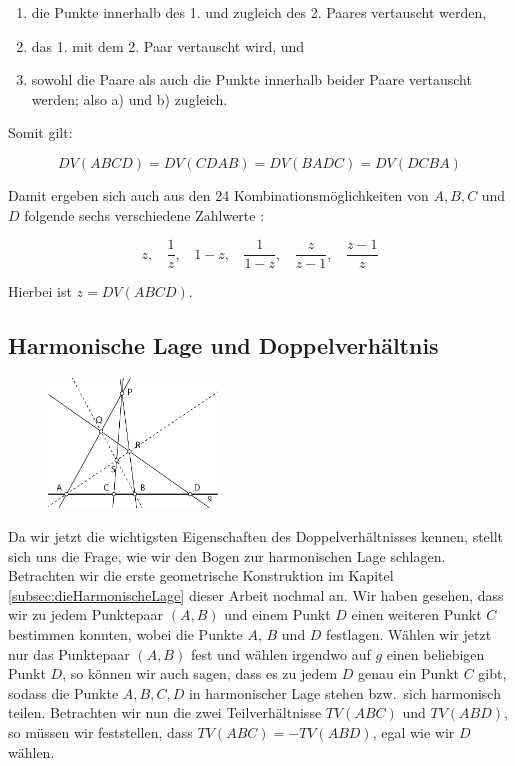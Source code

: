 \documentclass[12pt,a4paper]{article}
\begin{document}
\begin{enumerate}[label={\alph*)}] 
\item die Punkte innerhalb des 1. und zugleich des 2. Paares vertauscht werden,
\item das 1. mit dem 2. Paar vertauscht wird, und
\item sowohl die Paare als auch die Punkte innerhalb beider Paare vertauscht werden; also a) und b) zugleich.
\end{enumerate}

Somit gilt:

\[DV(A B C D) = DV(C D A B) = DV(B A D C) = DV(D C B A)\]

Damit ergeben sich auch aus den 24 Kombinationsmöglichkeiten von $A, B, C$ und $D$ folgende sechs verschiedene Zahlwerte \citep[s.][S.~77f]{projektiveGeometrie}:

\[z, ~~~~\dfrac{1}{z}, ~~~~1-z, ~~~~\dfrac{1}{1-z}, ~~~~\dfrac{z}{z-1}, ~~~~\dfrac{z-1}{z}\]

Hierbei ist $z = DV(A B C D)$.

\subsection{Harmonische Lage und Doppelverhältnis}

\begin{figure}
\includegraphics[width=0.4\textwidth]{Bilder/herleitung3.png}
\end{figure}

Da wir jetzt die wichtigsten Eigenschaften des Doppelverhältnisses kennen, stellt sich uns die Frage, wie wir den Bogen zur harmonischen Lage schlagen. Betrachten wir die erste geometrische Konstruktion im Kapitel \ref{subsec:dieHarmonischeLage} dieser Arbeit nochmal an. Wir haben gesehen, dass wir zu jedem Punktepaar $(A, B)$ und einem Punkt $D$ einen weiteren Punkt $C$ bestimmen konnten, wobei die Punkte $A$, $B$ und $D$ festlagen. Wählen wir jetzt nur das Punktepaar $(A, B)$ fest und wählen irgendwo auf $g$ einen beliebigen Punkt $D$, so können wir auch sagen, dass es zu jedem $D$ genau ein Punkt $C$ gibt, sodass die Punkte $A, B, C, D$ in harmonischer Lage stehen bzw.~sich harmonisch teilen.
\newline
Betrachten wir nun die zwei Teilverhältnisse $TV(A B C)$ und $TV(A B D)$, so müssen wir feststellen, dass $TV(A B C) = -TV(A B D)$, egal wie wir $D$ wählen.
\end{document}
